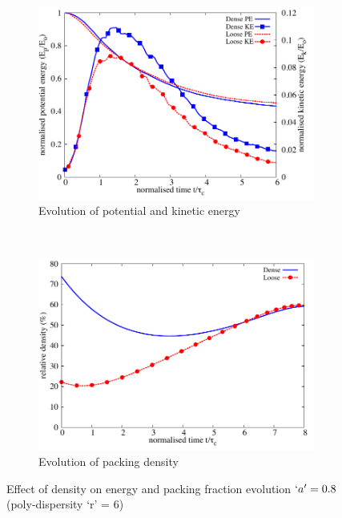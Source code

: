 \begin{figure}[tbhp]
\centering
\begin{subfigure}[b]{0.75\textwidth}
\centering
\includegraphics[width=\textwidth]{Energy_dense_r6}
\caption{Evolution of potential and kinetic energy}
\label{fig:Energy_dense_r6}
\end{subfigure}
\\
\begin{subfigure}[b]{0.75\textwidth}
\centering
\includegraphics[width=\textwidth]{voro_r6}
\caption{Evolution of packing density}
\label{fig:voro_r6}
\end{subfigure}
\caption{Effect of density on energy and packing fraction evolution $`a' = 
0.8$ 
(poly-dispersity `r' = 6)}
\label{fig:Energy_voro_r6}
\end{figure}

